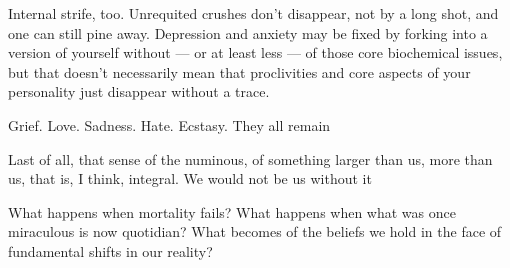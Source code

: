 Internal strife, too. Unrequited crushes don't disappear, not by a long shot, and one can still pine away. Depression and anxiety may be fixed by forking into a version of yourself without --- or at least less --- of those core biochemical issues, but that doesn't necessarily mean that proclivities and core aspects of your personality just disappear without a trace.

Grief. Love. Sadness. Hate. Ecstasy. They all remain

Last of all, that sense of the numinous, of something larger than us, more than us, that is, I think, integral. We would not be us without it

What happens when mortality fails? What happens when what was once miraculous is now quotidian? What becomes of the beliefs we hold in the face of fundamental shifts in our reality?
